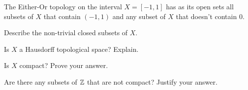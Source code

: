 \item The Either-Or topology on the interval $X = [-1,1]$ has as its open sets all subsets of $X$ that contain $(-1,1)$ and any subset of $X$ that doesn't contain $0$. 
\ba

\item Describe the non-trivial closed subsets of $X$.

\item Is $X$ a Hausdorff topological space? Explain.

\item Is $X$ compact? Prove your answer.

\item Are there any subsets of $\mathbb{Z}$ that are not compact? Justify your answer. 

\ea

\begin{comment}

\ExerciseSolution

\ba

\item If $A$ is a subset of $X$ that contains $0$, then $X \setminus A$ doesn't contain $0$ and is therefore open. The complement of $\{-1,1\}$ is $(-1,1)$, which is open. The complement of $\{-1\}$ is $(-1,1] = (-1,1) \cup \{1\}$, which is open. The complement of $\{1\}$ is $[-1,1) = \{-1\} \cup (-1,1)$, which is open. To show that these are the only non-trivial closed sets, suppose that $A$ is a closed subset of $X$ that doesn't contain $0$. Then $X \setminus A$ contains $0$. The only open set that contains $0$ is $(-1,1)$, and so $X \setminus A$ must be equal to $(-1,1) \cup O$ for some open set $O$. This implies that $A$ is a subset of $\{-1,1\}$. 

\item Since not all single point sets are closed in $X$, we conclude that $X$ is not a Hausdorff space. 

\item Suppose $\{O_{\alpha}\}_{\alpha \in I}$ is an open cover of $\Z$. Let $O_1$ be one of the $O_{\alpha}$ that contains $0$. It follows that $(-1,1) \subseteq O_1$.  Now let $O_2$ be one of the $O_{\alpha}$ that contains $-1$ and $O_3$ one of the $O_{\alpha}$ that contains $1$. Then $\{O_1, O_2, O_3\}$ is a finite subcover of $\{O_{\alpha}\}_{\alpha \in I}$. We conclude that $\Z$ is compact. 

\item Recall that closed subsets of compact spaces are compact. So we look for a subset of $X$ that is not closed. Let $A = X \setminus \{0\}$. If $a \in A$, we know that $\{a\}$ is an open set. Then $\{\{a\}\}_{a \in A}$ is an open cover of $A$ with no finite subcover. So $A$ is not compact.  

\ea

\end{comment}


